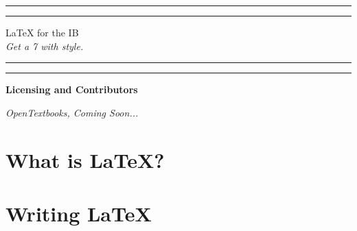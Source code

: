 \documentclass[12pt,a4paper]{article}
\begin{document}

\begin{titlepage}
\centering %
\scshape %
\vfill

\rule{\textwidth}{1.6pt}\vspace*{-\baselineskip}\vspace*{2pt}
\rule{\textwidth}{0.4pt}

\vspace{1.5\baselineskip} %
\LARGE{\LaTeX{} for the IB}\\
\vspace{0.2\baselineskip}
\small{\textit{Get a 7 with style.}}
\vspace{0.75\baselineskip} %

\rule{\textwidth}{0.4pt}\vspace*{-\baselineskip}\vspace{3.2pt}
\rule{\textwidth}{1.6pt}

\vfill
\end{titlepage}



\begin{center}
\Large{\textbf{Licensing and Contributors}}

\vfill
\small{\textit{OpenTextbooks, Coming Soon\texttrademark...}}
\vfill

\newpage
\end{center}

\begin{center}
\tableofcontents
\newpage
\end{center}


\section{What is LaTeX?}






\newpage
\section{Writing LaTeX}
\end{document}
